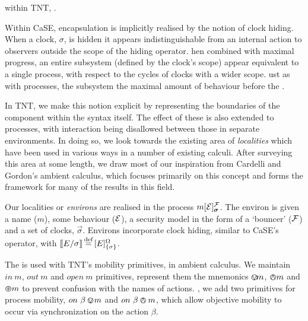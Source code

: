 \documentclass[orivec,envcountsame]{llncs}
\begin{document}
 within TNT,
.

Within CaSE, encapsulation is implicitly realised by the notion of clock
hiding.  When a clock, $\sigma$, is hidden it appears indistinguishable
from an internal action to observers outside the scope of the hiding
operator.  hen combined with maximal
progress,  an entire subsystem (defined by
the clock's scope) appear equivalent to a single
process, with respect to the cycles of clocks with a wider scope.
ust as with processes, the subsystem
 the maximal amount of behaviour before the
.

In TNT, we make this notion explicit by representing the boundaries of
the component within the syntax itself.  The effect of these is also
extended to processes, with interaction being disallowed between those
in separate environments.  In doing so, we look towards the existing
area of \emph{localities} \cite{obslocal,pawl} which have been used in
various ways in a number of existing calculi.  After surveying this area
at some length, we draw most of our inspiration from Cardelli and
Gordon's ambient calculus, which focuses primarily on this concept and
forms the framework for many of the results in this field.

Our localities or \emph{environs} are realised in the process
$\locv{m}{\expr}{\exprb}{\vec{\sigma}}$.  The environ is given a name
($m$), some behaviour ($\text{$\mathcal{E}$}$), a security model in the form of a
`bouncer' ($\text{$\mathcal{F}$}$) and a set of clocks, $\vec{\sigma}$.  Environs incorporate clock hiding,
similar to CaSE's operator, with $[\hspace{-0.3ex}[ E / {\sigma} ]\hspace{-0.3ex}] \operatorname{\stackrel{\textrm{def}}{=}} {}[ E ]^{\Omega}_{\{\sigma\}}$.

The  is used with TNT's mobility
primitives,  in
 ambient calculus.  We maintain
 $in\ m$, $out\ m$ and $open\ m$ primitives,
represent them 
the mnemonics $\varovee\!m$, $\varowedge m$ and $\varoast m$ to prevent
confusion with the names of actions.  , we add two primitives for
process mobility, $on\ \beta \varovee\!m$ and $on\ \beta \varowedge m$, which
allow objective mobility to occur via synchronization on the
action\MPS{\DELTEXT ,}{} $\beta$.
\end{document}

